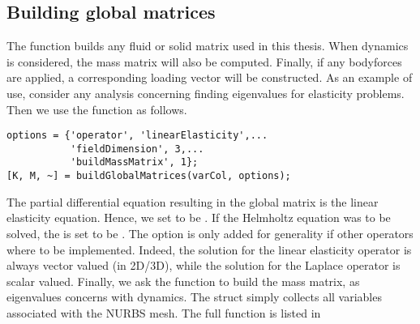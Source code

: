 \subsection{Building global matrices}
The function  builds any fluid or solid matrix used in this thesis. When dynamics is considered, the mass matrix will also be computed. Finally, if any bodyforces are applied, a corresponding loading vector will be constructed. As an example of use, consider any analysis concerning finding eigenvalues for elasticity problems. Then we use the function as follows.
\begin{lstlisting}
options = {'operator', 'linearElasticity',...
           'fieldDimension', 3,...
           'buildMassMatrix', 1};
[K, M, ~] = buildGlobalMatrices(varCol, options);
\end{lstlisting}
The partial differential equation resulting in the global matrix is the linear elasticity equation. Hence, we set  to be . If the Helmholtz equation was to be solved, the  is set to be . The option  is only added for generality if other operators where to be implemented. Indeed, the solution for the linear elasticity operator is always vector valued (in 2D/3D), while the solution for the Laplace operator is scalar valued. Finally, we ask the function to build the mass matrix, as eigenvalues concerns with dynamics. The struct  simply collects all variables associated with the NURBS mesh. The full function is listed in 
\raggedbottom

\newpage


